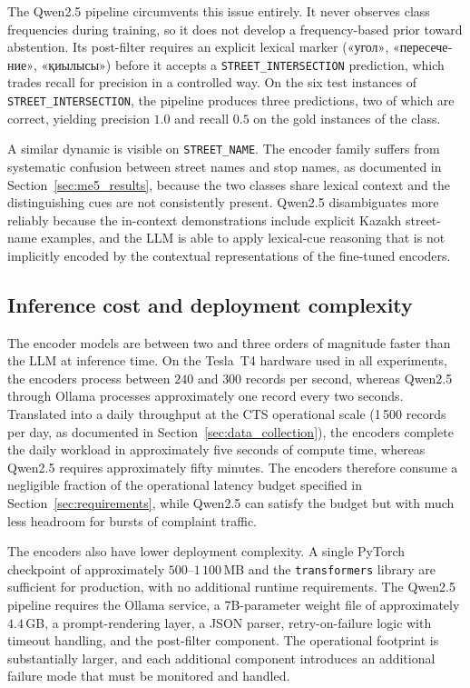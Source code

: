 The Qwen2.5 pipeline circumvents this issue entirely. It never observes class frequencies during training, so it does not develop a frequency-based prior toward abstention. Its post-filter requires an explicit lexical marker (\foreignlanguage{russian}{«угол»}, \foreignlanguage{russian}{«пересечение»}, \foreignlanguage{russian}{«қиылысы»}) before it accepts a \texttt{STREET\_INTERSECTION} prediction, which trades recall for precision in a controlled way. On the six test instances of \texttt{STREET\_INTERSECTION}, the pipeline produces three predictions, two of which are correct, yielding precision $1.0$ and recall $0.5$ on the gold instances of the class.

A similar dynamic is visible on \texttt{STREET\_NAME}. The encoder family suffers from systematic confusion between street names and stop names, as documented in Section~\ref{sec:me5_results}, because the two classes share lexical context and the distinguishing cues are not consistently present. Qwen2.5 disambiguates more reliably because the in-context demonstrations include explicit Kazakh street-name examples, and the LLM is able to apply lexical-cue reasoning that is not implicitly encoded by the contextual representations of the fine-tuned encoders.

\subsection{Inference cost and deployment complexity}
\label{sec:cost_deployment}

The encoder models are between two and three orders of magnitude faster than the LLM at inference time. On the Tesla~T4 hardware used in all experiments, the encoders process between $240$ and $300$ records per second, whereas Qwen2.5 through Ollama processes approximately one record every two seconds. Translated into a daily throughput at the CTS operational scale (1\,500 records per day, as documented in Section~\ref{sec:data_collection}), the encoders complete the daily workload in approximately five seconds of compute time, whereas Qwen2.5 requires approximately fifty minutes. The encoders therefore consume a negligible fraction of the operational latency budget specified in Section~\ref{sec:requirements}, while Qwen2.5 can satisfy the budget but with much less headroom for bursts of complaint traffic.

The encoders also have lower deployment complexity. A single PyTorch checkpoint of approximately $500$--$1\,100$\,MB and the \texttt{transformers} library are sufficient for production, with no additional runtime requirements. The Qwen2.5 pipeline requires the Ollama service, a 7B-parameter weight file of approximately $4.4$\,GB, a prompt-rendering layer, a JSON parser, retry-on-failure logic with timeout handling, and the post-filter component. The operational footprint is substantially larger, and each additional component introduces an additional failure mode that must be monitored and handled.

